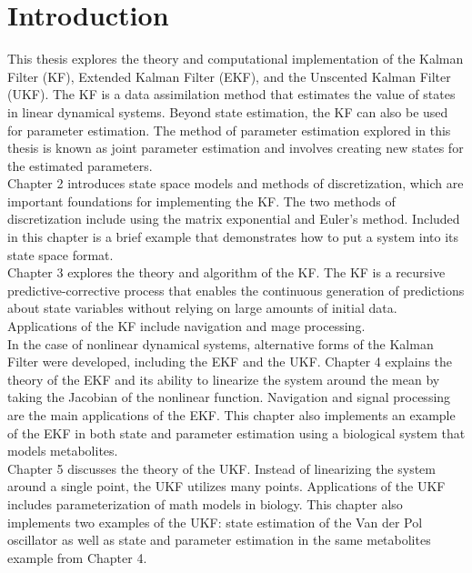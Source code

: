 \chapter{Introduction}
\label{Introduction}

\noindent This thesis explores the theory and computational implementation of the Kalman Filter (KF), Extended Kalman Filter (EKF), and the Unscented Kalman Filter (UKF). The KF is a data assimilation method that estimates the value of states in linear dynamical systems. Beyond state estimation, the KF can also be used for parameter estimation. The method of parameter estimation explored in this thesis is known as joint parameter estimation and involves creating new states for the estimated parameters.\\ 

\noindent Chapter 2 introduces state space models and methods of discretization, which are important foundations for implementing the KF. The two methods of discretization include using the matrix exponential and Euler's method. Included in this chapter is a brief example that demonstrates how to put a system into its state space format. \\ 

\noindent Chapter 3 explores the theory and algorithm of the KF. The KF is a recursive predictive-corrective process that enables the continuous generation of predictions about state variables without relying on large amounts of initial data. Applications of the KF include navigation and mage processing. \\ 

\noindent In the case of nonlinear dynamical systems, alternative forms of the Kalman Filter were developed, including the EKF and the UKF. Chapter 4 explains the theory of the EKF and its ability to linearize the system around the mean by taking the Jacobian of the nonlinear function. Navigation and signal processing are the main applications of the EKF. This chapter also implements an example of the EKF in both state and parameter estimation using a biological system that models metabolites. \\

\noindent Chapter 5 discusses the theory of the UKF. Instead of linearizing the system around a single point, the UKF utilizes many points. Applications of the UKF includes parameterization of math models in biology. This chapter also implements two examples of the UKF: state estimation of the Van der Pol oscillator as well as state and parameter estimation in the same metabolites example from Chapter 4.  \\ 

